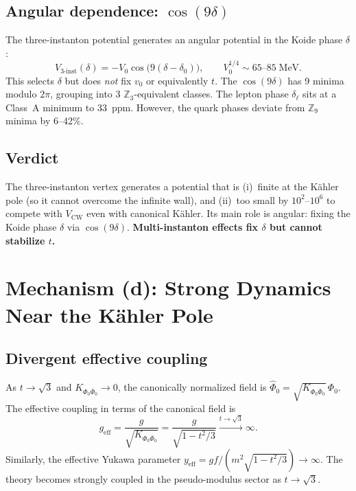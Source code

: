 \subsection{Angular dependence: $\cos(9\delta)$}

The three-instanton potential generates an angular potential in the Koide phase $\delta$:
\begin{equation}
V_{3\text{-inst}}(\delta) = -V_0\cos\!\big(9(\delta - \delta_0)\big),
\qquad V_0^{1/4} \sim 65\text{--}85\;\text{MeV}.
\end{equation}
This selects $\delta$ but does \emph{not} fix $v_0$ or equivalently $t$.
The $\cos(9\delta)$ has 9 minima modulo $2\pi$, grouping into 3 $\mathbb{Z}_3$-equivalent classes.
The lepton phase $\delta_\ell$ sits at a Class~A minimum to 33~ppm.
However, the quark phases deviate from $\mathbb{Z}_9$ minima by 6--42\%.

\subsection{Verdict}

The three-instanton vertex generates a potential that is (i)~finite at the K\"ahler pole
(so it cannot overcome the infinite wall), and (ii)~too small by $10^{2}$--$10^{6}$
to compete with $V_{\text{CW}}$ even with canonical K\"ahler.
Its main role is angular: fixing the Koide phase $\delta$ via $\cos(9\delta)$.
\textbf{Multi-instanton effects fix $\delta$ but cannot stabilize $t$.}


\section{Mechanism (d): Strong Dynamics Near the K\"ahler Pole}

\subsection{Divergent effective coupling}

As $t \to \sqrt{3}$ and $K_{\Phi_0\bar\Phi_0} \to 0$, the canonically normalized
field is $\hat\Phi_0 = \sqrt{K_{\Phi_0\bar\Phi_0}}\,\Phi_0$.
The effective coupling in terms of the canonical field is
\begin{equation}
g_{\text{eff}} = \frac{g}{\sqrt{K_{\Phi_0\bar\Phi_0}}}
= \frac{g}{\sqrt{1 - t^2/3}} \xrightarrow{t\to\sqrt{3}} \infty.
\end{equation}
Similarly, the effective Yukawa parameter $y_{\text{eff}} = gf/(m^2\sqrt{1-t^2/3}) \to \infty$.
The theory becomes strongly coupled in the pseudo-modulus sector as $t\to\sqrt{3}$.

